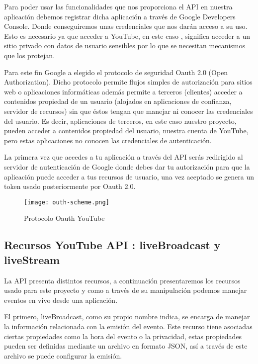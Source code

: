 Para  poder usar las funcionalidades que nos proporciona el API en nuestra aplicación debemos registrar dicha aplicación a través de Google Developers Console. Donde conseguiremos unas credenciales que nos darán acceso a su uso. Esto es necesario ya que acceder a YouTube, en este caso , significa acceder a un sitio privado con datos de usuario sensibles por lo que se necesitan mecanismos que los protejan.

Para este fin Google a elegido el  protocolo de seguridad Oauth 2.0 (Open Authorization). Dicho protocolo permite flujos simples de autorización para sitios web o aplicaciones informáticas además permite a terceros (clientes) acceder a contenidos propiedad de un usuario (alojados en aplicaciones de confianza, servidor de recursos) sin que éstos tengan que manejar ni conocer las credenciales del usuario. Es decir, aplicaciones de terceros, en este caso nuestro proyecto, pueden acceder a contenidos propiedad del usuario, nuestra cuenta de YouTube, pero estas aplicaciones no conocen las credenciales de autenticación. 

La primera vez que accedes a tu aplicación a través del API serás redirigido al servidor de autenticación de Google donde debes dar tu autorización para que la aplicación puede acceder a tus recursos de usuario, una vez aceptado se genera un token usado posteriormente por Oauth 2.0.

\begin{figure}[H]
    \centering
    \texttt{[image: outh-scheme.png]}
    \caption{Protocolo Oauth YouTube}
\end{figure}

\subsection{Recursos YouTube API : liveBroadcast y liveStream}

La API presenta distintos recursos, a continuación presentaremos los recursos usado para este proyecto y como a través de su manipulación podemos manejar eventos en vivo desde una aplicación.

El primero, liveBroadcast, como su propio nombre indica, se encarga de manejar la información relacionada con la emisión del evento. Este recurso tiene asociadas ciertas propiedades como la hora del evento o la privacidad, estas propiedades pueden ser definidas mediante un archivo en formato JSON, así a través de este archivo se puede configurar la emisión.



